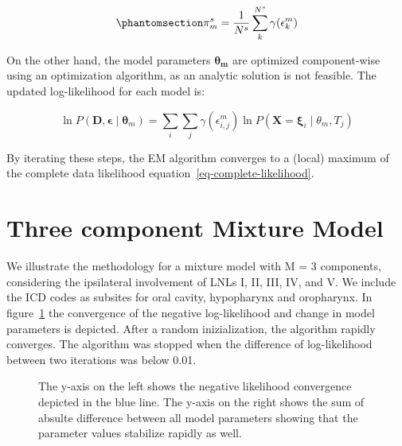\documentclass[
  sn-mathphys-num,
]{sn-jnl}
\begin{document}
\begin{equation}\phantomsection\label{eq-mixture-maximization}{
\pi_m^s = \frac{1}{N^s} \sum_k^{N^s} \gamma(\epsilon^m_k)
}\end{equation}

On the other hand, the model parameters \(\boldsymbol{\theta_m}\) are
optimized component-wise using an optimization algorithm, as an analytic
solution is not feasible. The updated log-likelihood for each model is:

\[
\ln P(\mathbf{D}, \boldsymbol{\epsilon} \mid \boldsymbol{\theta}_m) = \sum_{i} \sum_j \gamma(\epsilon^m_{i,j}) \ln P(\mathbf{X} = \boldsymbol{\xi}_i \mid \theta_m, T_j)
\]

By iterating these steps, the EM algorithm converges to a (local)
maximum of the complete data likelihood
equation~\ref{eq-complete-likelihood}.

\section{Three component Mixture Model}\label{sec-3comp}

We illustrate the methodology for a mixture model with M = 3 components,
considering the ipsilateral involvement of LNLs I, II, III, IV, and V.
We include the ICD codes as subsites for oral cavity, hypopharynx and
oropharynx. In figure~\ref{fig-convergence} the convergence of the
negative log-likelihood and change in model parameters is depicted.
After a random inizialization, the algorithm rapidly converges. The
algorithm was stopped when the difference of log-likelihood between two
iterations was below 0.01.

\begin{figure}


\caption{\label{fig-convergence}The y-axis on the left shows the
negative likelihood convergence depicted in the blue line. The y-axis on
the right shows the sum of absulte difference between all model
parameters showing that the parameter values stabilize rapidly as well.}

\end{figure}%
\end{document}
